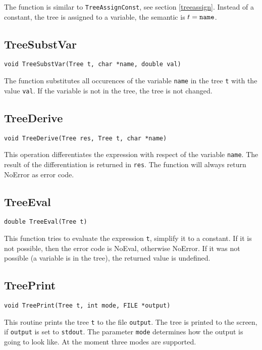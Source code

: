 The function is similar to {\tt TreeAssignConst}, see section 
\ref{treeassign}. Instead of a constant, the tree is assigned to a
variable, \ie the semantic is $t = \mbox{{\tt name}}$.

\subsection{TreeSubstVar}
\begin{verbatim}
void TreeSubstVar(Tree t, char *name, double val)
\end{verbatim}

The function substitutes all occurences of the variable {\tt name} in 
the tree {\tt t} with the value {\tt val}. If the variable is not 
in the tree, the tree is not changed.

\subsection{TreeDerive}
\begin{verbatim}
void TreeDerive(Tree res, Tree t, char *name)
\end{verbatim}

This operation differentiates the expression with respect of the 
variable {\tt name}. The result of the differentiation is returned 
in {\tt res}. The function will always return NoError as error code.

\subsection{TreeEval}
\begin{verbatim}
double TreeEval(Tree t)
\end{verbatim}

This function tries to evaluate the expression {\tt t}, \ie simplify 
it to a constant. If it is not possible, then the error code is
NoEval, otherwise NoError. If it was not possible
(a variable is in the tree), the returned value is undefined.

\subsection{TreePrint}
\begin{verbatim}
void TreePrint(Tree t, int mode, FILE *output)
\end{verbatim}

This routine prints the tree {\tt t} to the file {\tt output}. 
The tree is printed to the screen, if {\tt output} is set to 
{\tt stdout}. The parameter {\tt mode} determines
how the output is going to look like. At the moment three modes are
supported. 


